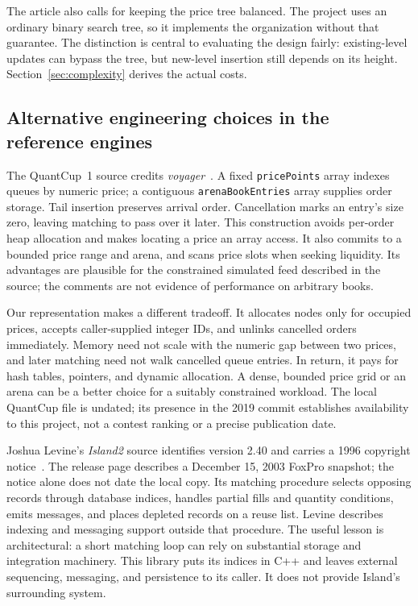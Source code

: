 \documentclass[10pt,letterpaper,twocolumn]{article}
\newcommand{\code}[1]{\texttt{#1}}
\begin{document}
The article also calls for keeping the price tree balanced. The project uses
an ordinary binary search tree, so it implements the organization without
that guarantee. The distinction is central to evaluating the design fairly:
existing-level updates can bypass the tree, but new-level insertion still
depends on its height. Section~\ref{sec:complexity} derives the actual costs.

\subsection{Alternative engineering choices in the reference engines}
The QuantCup~1 source credits \emph{voyager}~\cite{quantcup}. A fixed
\code{pricePoints} array indexes queues by numeric price; a contiguous
\code{arenaBookEntries} array supplies order storage. Tail insertion
preserves arrival order. Cancellation marks an entry's size zero, leaving
matching to pass over it later. This construction avoids per-order heap
allocation and makes locating a price an array access. It also commits to a
bounded price range and arena, and scans price slots when seeking liquidity.
Its advantages are plausible for the constrained simulated feed described in
the source; the comments are not evidence of performance on arbitrary books.

Our representation makes a different tradeoff. It allocates nodes only for
occupied prices, accepts caller-supplied integer IDs, and unlinks cancelled
orders immediately. Memory need not scale with the numeric gap between two
prices, and later matching need not walk cancelled queue entries. In return,
it pays for hash tables, pointers, and dynamic allocation. A dense, bounded
price grid or an arena can be a better choice for a suitably constrained
workload. The local QuantCup file is undated; its presence in the 2019 commit
establishes availability to this project, not a contest ranking or a precise
publication date.

Joshua Levine's \emph{Island2} source identifies version 2.40 and carries a
1996 copyright notice~\cite{island}. The release page describes a December 15,
2003 FoxPro snapshot; the notice alone does not date the local copy. Its
matching procedure selects opposing records through database indices, handles
partial fills and quantity conditions, emits messages, and places depleted
records on a reuse list. Levine describes indexing and messaging support
outside that procedure. The useful lesson is architectural: a short matching
loop can rely on substantial storage and integration machinery. This library
puts its indices in C++ and leaves external sequencing, messaging, and
persistence to its caller. It does not provide Island's surrounding system.
\end{document}
